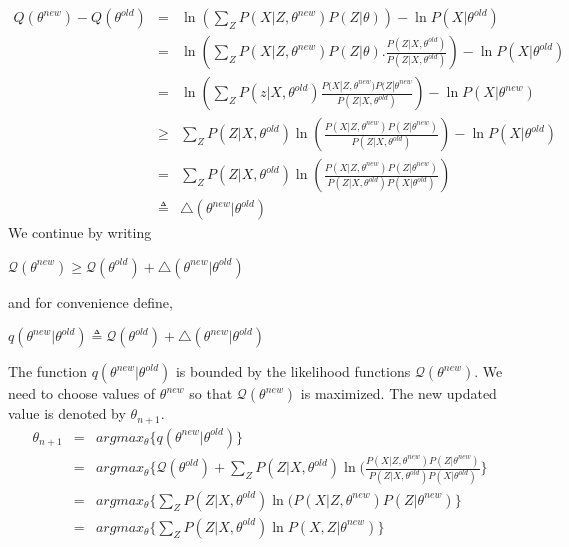 \documentclass[12pt]{dalcsthesis}
\begin{document}
\begin{eqnarray}
Q(\theta^{new})-Q(\theta^{old}) & = & \ln(\sum_{Z}P(X|Z,\theta^{new})P(Z|\theta))-\ln P(X|\theta^{old})\\
 & = & \ln(\sum_{Z}P(X|Z,\theta^{new})P(Z|\theta).\frac{P(Z|X,\theta^{old})}{P(Z|X,\theta^{old})})-\ln P(X|\theta^{old})\\
 & = & \ln(\sum_{Z}P(z|X,\theta^{old})\frac{P(X|Z,\theta^{new})P(Z|\theta^{new}}{P(Z|X,\theta^{old})})-\ln P(X|\theta^{new})\\
 & \geq & \sum_{Z}P(Z|X,\theta^{old})\ln(\frac{P(X|Z,\theta^{new})P(Z|\theta^{new})}{P(Z|X,\theta^{old})})-\ln P(X|\theta^{old})\\
 & = & \sum_{Z}P(Z|X,\theta^{old})\ln(\frac{P(X|Z,\theta^{new})P(Z|\theta^{new})}{P(Z|X,\theta^{old})P(X|\theta^{old})})\\
 & \triangleq & \triangle(\theta^{new}|\theta^{old})
\end{eqnarray}
We continue by writing

$\mathcal{Q}(\theta^{new})\geq\mathcal{Q}(\theta^{old})+\triangle(\theta^{new}|\theta^{old})$

and for convenience define,

$q(\theta^{new}|\theta^{old})\triangleq\mathcal{Q}(\theta^{old})+\triangle(\theta^{new}|\theta^{old})$

The function $q(\theta^{new}|\theta^{old})$ is bounded by the likelihood
functions $\mathcal{Q}(\theta^{new})$. We need to choose values of
$\theta^{new}$ so that $\mathcal{Q}(\theta^{new})$ is maximized.
The new updated value is denoted by $\theta_{n+1}.$
\begin{eqnarray}
\theta_{n+1} & = & argmax_{\theta}\{q(\theta^{new}|\theta^{old})\}\\
 & = & argmax_{\theta}\{\mathcal{Q}(\theta^{old})+\sum_{Z}P(Z|X,\theta^{old})\ln(\frac{P(X|Z,\theta^{new})P(Z|\theta^{new})}{P(Z|X,\theta^{old})P(X|\theta^{old})}\}\\
 & = & argmax_{\theta}\{\sum_{Z}P(Z|X,\theta^{old})\ln(P(X|Z,\theta^{new})P(Z|\theta^{new})\}\\
 & = & argmax_{\theta}\{\sum_{Z}P(Z|X,\theta^{old})\ln P(X,Z|\theta^{new})\}\\
\end{eqnarray}
\end{document}
